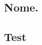 \documentclass{article}
\begin{document}

\postextual





\begin{anexosenv}
\partanexos  %
\chapter{Nome.} %

\section{Test} %

\end{anexosenv}
\end{document}
